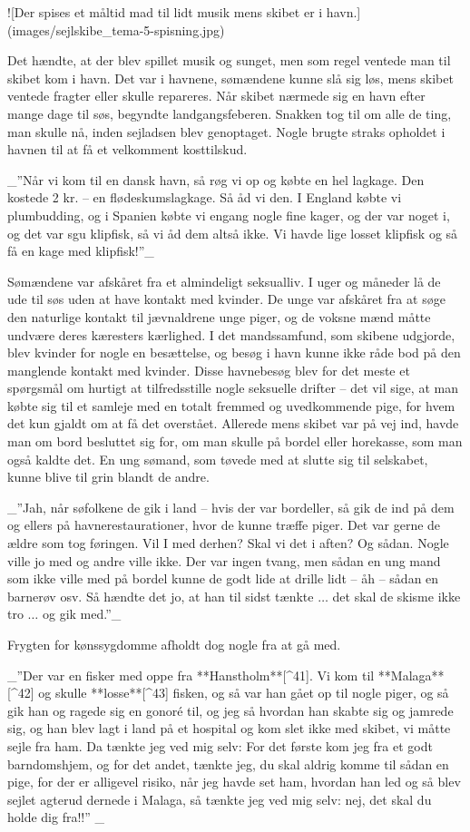 \documentclass{book}
\begin{document}
![Der spises et måltid mad til lidt musik mens skibet er i
havn.](images/sejlskibe_tema-5-spisning.jpg)

Det hændte, at der blev spillet musik og sunget, men som regel ventede man til skibet kom i havn. Det var i
havnene, sømændene kunne slå sig løs, mens skibet ventede fragter eller skulle repareres.
Når skibet nærmede sig en havn efter mange dage til søs, begyndte landgangsfeberen.
Snakken tog til om alle de ting, man skulle nå, inden sejladsen blev genoptaget. Nogle
brugte straks opholdet i havnen til at få et velkomment kosttilskud.

 _”Når vi kom til en dansk havn, så røg vi op og købte en hel lagkage. Den kostede 2 kr. –
en flødeskumslagkage. Så åd vi den. I England købte vi plumbudding, og i Spanien købte vi
engang nogle fine kager, og der var noget i, og det var sgu klipfisk, så vi åd dem altså
ikke. Vi havde lige losset klipfisk og så få en kage med klipfisk!”_

Sømændene var afskåret fra et almindeligt seksualliv. I uger og måneder lå de ude til søs
uden at have kontakt med kvinder. De unge var afskåret fra at søge den naturlige kontakt
til jævnaldrene unge piger, og de voksne mænd måtte undvære deres kæresters kærlighed. I
det mandssamfund, som skibene udgjorde, blev kvinder for nogle en besættelse, og besøg i
havn kunne ikke råde bod på den manglende kontakt med kvinder. Disse havnebesøg blev for
det meste et spørgsmål om hurtigt at tilfredsstille nogle seksuelle drifter – det vil
sige, at man købte sig til et samleje med en totalt fremmed og uvedkommende pige, for hvem
det kun gjaldt om at få det overstået. Allerede mens skibet var på vej ind, havde man om
bord besluttet sig for, om man skulle på bordel eller horekasse, som man også kaldte det.
En ung sømand, som tøvede med at slutte sig til selskabet, kunne blive til grin blandt de
andre.

 _”Jah, når søfolkene de gik i land – hvis der var bordeller, så gik de ind på dem og ellers
på havnerestaurationer, hvor de kunne træffe piger. Det var gerne de ældre som tog
føringen. Vil I med derhen? Skal vi det i aften? Og sådan. Nogle ville jo med og andre
ville ikke. Der var ingen tvang, men sådan en ung mand som ikke ville med på bordel kunne
de godt lide at drille lidt – åh – sådan en barnerøv osv. Så hændte det jo, at han til
sidst tænkte $\ldots$ det skal de skisme ikke tro $\ldots$ og gik med.”_

Frygten for kønssygdomme afholdt dog nogle fra at gå med.

 _”Der var en fisker med oppe fra **Hanstholm**[^41]. Vi kom til **Malaga**[^42] og skulle **losse**[^43] fisken, og så
var han gået op til nogle piger, og så gik han og ragede sig en gonoré til, og jeg så
hvordan han skabte sig og jamrede sig, og han blev lagt i land på et hospital og kom slet
ikke med skibet, vi måtte sejle fra ham. Da tænkte jeg ved mig selv: For det første kom
jeg fra et godt barndomshjem, og for det andet, tænkte jeg, du skal aldrig komme til sådan
en pige, for der er alligevel risiko, når jeg havde set ham, hvordan han led og så blev
sejlet agterud dernede i Malaga, så tænkte jeg ved mig selv: nej, det skal du holde dig
fra!!” _
\end{document}
